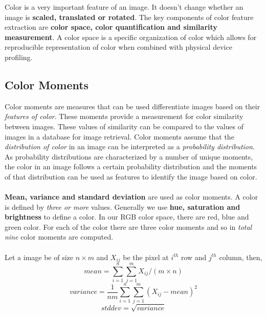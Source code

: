 \documentclass[pstricks,10pt,notitlepage]{report}
\begin{document}
Color is a very important feature of an image. It doesn’t change whether an image is \textbf{scaled, translated or rotated}. The key components of color feature extraction are \textbf{color space, color quantification and similarity measurement}. A color space is a specific organization of color which allows for reproducible representation of color when combined with physical device profiling.

\subsection{Color Moments}
Color moments are measures that can be used differentiate images based on their \textit{features of color}. These moments provide a measurement for color similarity between images. These values of similarity can be compared to the values of images in a database for image retrieval. Color moments assume that the \textit{distribution of color} in an image can be interpreted as a \textit{probability distribution}. As probability distributions are characterized by a number of unique moments, the color in an image follows a certain probability distribution and the moments of that distribution can be used as features to identify the image based on color.\\
\\
\textbf{Mean, variance and standard deviation} are used as color moments\cite{n10}. A color is defined by \textit{three or more} values. Generally we use \textbf{hue, saturation and brightness} to define a color. In our RGB color space, there are red, blue and green color. For each of the color there are three color moments and so in \textit{total nine} color moments are computed. \\
\\
Let a image be of size $n\times m$ and $X_{ij}$ be the pixel at $i^{th}$ row and $j^{th}$ column, then,\\
\begin{equation}
mean=\sum_{i=1}^{n}\sum_{j=1}^{m}X_{ij}/(m \times n)\label{eq:1}
\end{equation}
\begin{equation}
variance=\frac{1}{nm}\sum_{i=1}^{n}\sum_{j=1}^{m}(X_{ij}-mean)^{2}\label{eq:2}
\end{equation}
\begin{equation}
stddev=\sqrt{variance}\label{eq:3}
\end{equation}
\end{document}
